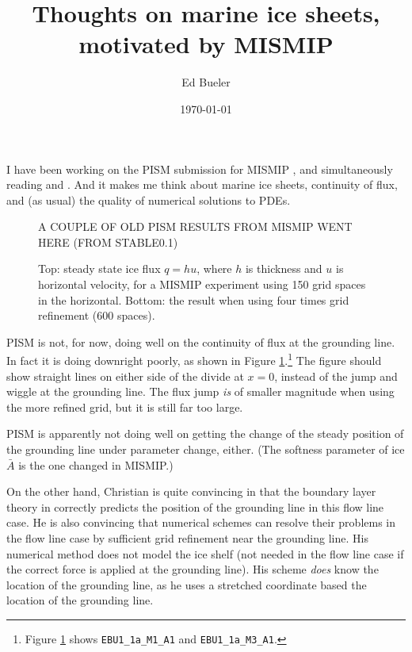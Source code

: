 \documentclass[11pt,final]{amsart}
\begin{document}
\title{Thoughts on marine ice sheets, motivated by MISMIP}
\author{Ed Bueler}
\date{\today}
\maketitle

I have been working on the PISM submission for MISMIP \cite{MISMIPwebpage}, and simultaneously reading \cite{SchoofMarine2} and \cite{SchoofMarine1}.  And it makes me think about marine ice sheets, continuity of flux, and (as usual) the quality of numerical solutions to PDEs.


\begin{figure}[ht]
A COUPLE OF OLD PISM RESULTS FROM MISMIP WENT HERE (FROM STABLE0.1)
\caption{Top: steady state ice flux $q=hu$, where $h$ is thickness and $u$ is horizontal velocity, for a MISMIP experiment using 150 grid spaces in the horizontal.  Bottom: the result when using four times grid refinement (600 spaces).}
\label{fig:badflux}
\end{figure}

PISM is not, for now, doing well on the continuity of flux at the grounding line.  In fact it is doing downright poorly, as shown in Figure \ref{fig:badflux}.\footnote{Figure \ref{fig:badflux} shows \texttt{EBU1\_1a\_M1\_A1} and \texttt{EBU1\_1a\_M3\_A1}.}  The figure should show straight lines on either side of the divide at $x=0$, instead of the jump and wiggle at the grounding line.  The flux jump \emph{is} of smaller magnitude when using the more refined grid, but it is still far too large.

PISM is apparently not doing well on getting the change of the steady position of the grounding line under parameter change, either.  (The softness parameter of ice $\bar A$ is the one changed in MISMIP.)

On the other hand, Christian is quite convincing in \cite{SchoofMarine2} that the boundary layer theory in \cite{SchoofMarine1} correctly predicts the position of the grounding line in this flow line case.  He is also convincing that numerical schemes can resolve their problems in the flow line case by sufficient grid refinement near the grounding line.  His numerical method does not model the ice shelf (not needed in the flow line case if the correct force is applied at the grounding line).  His scheme \emph{does} know the location of the grounding line, as he uses a stretched coordinate based the location of the grounding line.
\end{document}
